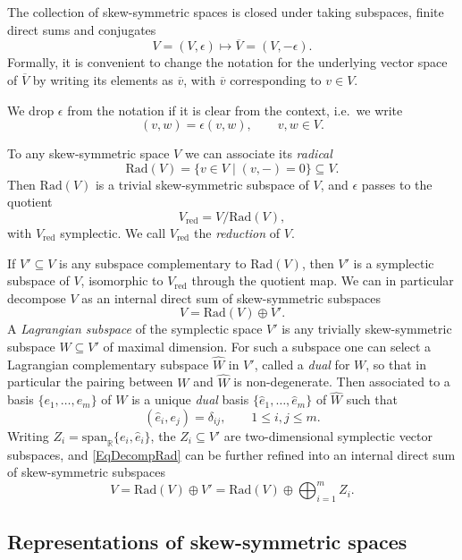 \documentclass[11pt, reqno]{amsart}
\theoremstyle{definition}
\numberwithin{equation}{section}
\def\R{\mathbb R}
\newcommand{\Rad}{\mathrm{Rad}}
\newcommand{\redu}{\mathrm{red}}
\begin{document}
The collection of skew-symmetric spaces is closed under taking subspaces, finite direct sums and conjugates 
\[
V = (V,\epsilon) \mapsto \overline{V} = (V,-\epsilon).
\]
Formally, it is convenient to change the notation for the underlying vector space of $\overline{V}$ by writing its elements as $\overline{v}$, with $\overline{v}$ corresponding to $v\in V$.

We drop $\epsilon$ from the notation if it is clear from the context, i.e.\ we write 
\[
(v,w) = \epsilon(v,w),\qquad v,w\in V.
\]

To any skew-symmetric space $V$ we can associate its \emph{radical} 
\[
\Rad(V) = \{v\in V\mid (v,-) = 0\} \subseteq V. 
\]
Then $\Rad(V)$ is a trivial skew-symmetric subspace of $V$, and $\epsilon$ passes to the quotient
\begin{equation}\label{EqReduction}
V_{\redu} = V/\Rad(V), 
\end{equation}
with $V_{\redu}$ symplectic. We call $V_{\redu}$ the \emph{reduction} of $V$.


If $V'\subseteq V$ is any subspace complementary to $\Rad(V)$, then $V'$ is a symplectic subspace of $V$, isomorphic to $V_{\redu}$ through the quotient map. We can in particular decompose $V$ as an internal direct sum of skew-symmetric subspaces
\begin{equation}\label{EqDecompRad}
V = \Rad(V) \oplus V'. 
\end{equation}
A \emph{Lagrangian subspace} of the symplectic space $V'$ is any trivially skew-symmetric subspace $W \subseteq V'$ of maximal dimension. For such a subspace one can select a Lagrangian complementary subspace $\hat{W}$ in $V'$, called a \emph{dual} for $W$, so that in particular the pairing between $W$ and $\hat{W}$ is non-degenerate. Then associated to  a basis $\{e_1,\ldots,e_m\}$ of $W$ is a unique \emph{dual} basis $\{\hat{e}_1,\ldots,\hat{e}_m\}$ of $\hat{W}$ such that 
\[
(\hat{e}_i,e_j) = \delta_{ij},\qquad 1\leq i,j\leq m.  
\]
Writing $Z_i = \mathrm{span}_{\R}\{e_i,\hat{e}_i\}$, the $Z_i \subseteq V'$ are two-dimensional symplectic vector subspaces, and \eqref{EqDecompRad} can be further refined into  an internal direct sum of skew-symmetric subspaces
\begin{equation}\label{EqDecompRadRefined}
V = \Rad(V) \oplus V' = \Rad(V) \oplus \bigoplus_{i=1}^m Z_i. 
\end{equation}

\subsection{Representations of skew-symmetric spaces}
\end{document}
